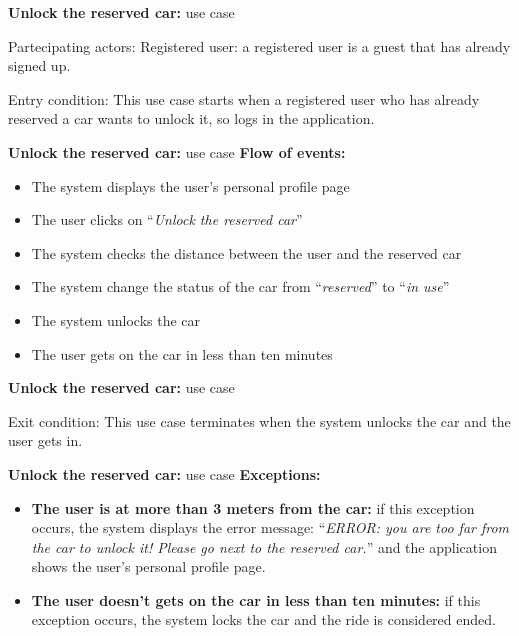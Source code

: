 \documentclass{beamer}
\begin{document}
	\begin{frame}{\textbf{Unlock the reserved car:} use case}
		\begin{block}{Partecipating actors:}
			Registered user: a registered user is a guest that has already signed up.
		\end{block}
		\begin{block}{Entry condition:}
			This use case starts when a registered user who has already reserved a car wants to unlock it, so logs in the application.
		\end{block}
	\end{frame}
	
	\begin{frame} {\textbf{Unlock the reserved car:} use case}
		\textbf{Flow of events:}\\
		\begin{itemize} 
			\item The system displays the user's personal profile page
			\item The user clicks on ``\textit{Unlock the reserved car}''
			\item The system checks the distance between the user and the reserved car
			\item The system change the status of the car from ``\textit{reserved}'' to ``\textit{in use}''
			\item The system unlocks the car
			\item The user gets on the car in less than ten minutes
		\end{itemize}
	\end{frame}
	
	\begin{frame}{\textbf{Unlock the reserved car:} use case}
		\begin{block}{Exit condition:}
			This use case terminates when the system unlocks the car and the user gets in.
		\end{block}
	\end{frame}
	
	\begin{frame}{\textbf{Unlock the reserved car:} use case}
		\textbf{Exceptions:}\\
		\begin{itemize}
			\item \textbf{The user is at more than 3 meters from the car:} if this exception occurs, the system displays the error message: ``\textit{ERROR: you are too far from the car to unlock it! Please go next to the reserved car.}'' and the application shows the user's personal profile page.
			\item \textbf{The user doesn't gets on the car in less than ten minutes:} if this exception occurs, the system locks the car and the ride is considered ended.
		\end{itemize}
	\end{frame}
\end{document}
